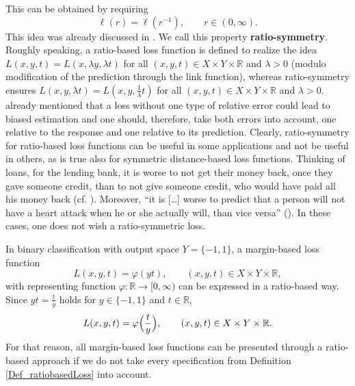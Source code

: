 \documentclass[10pt]{article}
\newcommand{\anf}[1]{\enquote{#1}}
\newcommand{\R}{\mathbb{R}}
\newcommand{\XY}{X \times Y}
\begin{document}
This can be obtained by requiring 
\begin{equation*} 
	\ell(r) = \ell(r^{-1}), \qquad r \in (0, \infty).
\end{equation*}
This idea was already discussed in \cite{LimpertStahel2001}.
We call this property \textbf{ratio-symmetry}.
Roughly speaking, a ratio-based loss function is defined to realize the idea $L(x,y,t) = L(x,\lambda y, \lambda t)$ for all $(x,y,t) \in \XY \times \R$ and $\lambda > 0$ (modulo modification of the prediction through the link function), whereas ratio-symmetry ensures $L(x,y,\lambda t) = L(x,y,\frac{1}{\lambda}t)$ for all $(x,y,t) \in \XY\times \R$ and $\lambda > 0$.
\cite{ChenEtAl2010LARE, ChenEtAl2016LPRE} already mentioned that a loss without one type of relative error could lead to biased estimation and one should, therefore, take both errors into account, one relative to the response and one relative to its prediction.
Clearly, ratio-symmetry for ratio-based loss functions can be useful in some applications and not be useful in others, as is true also for symmetric distance-based loss functions. 
Thinking of loans, for the lending bank, it is worse to not get their money back, once they gave someone credit, than to not give someone credit, who would have paid all his money back (cf. \cite[credit-scoring]{FahrmeirHamerleTutz1996}).
Moreover, \anf{it is [\dots] worse to predict that a person will not have a heart attack when he or she actually will, than vice versa} (\cite[Chapter 9.2.4]{HastieTibshiraniFriedman2017}).
In these cases, one does not wish a ratio-symmetric loss. \par 
In binary classification with output space $Y = \{-1, 1\}$, a margin-based loss function
\begin{equation*}
	L(x,y,t) = \varphi(yt), \qquad (x,y,t) \in \XY \times \R,
\end{equation*}
with representing function $\varphi: \R \to [0, \infty)$ can be expressed in a ratio-based way.
Since $yt = \frac{t}{y}$ holds for $y \in \{-1,1\}$ and $t \in \R$,
\begin{equation*}
	L(x,y,t) = \varphi\Bigl(\frac{t}{y}\Bigr), \qquad (x,y,t) \in \XY \times \R.
\end{equation*}
For that reason, all margin-based loss functions can be presented through a ratio-based approach if we do not take every specification from Definition \ref{Def_ratiobasedLoss} into account.
\end{document}
